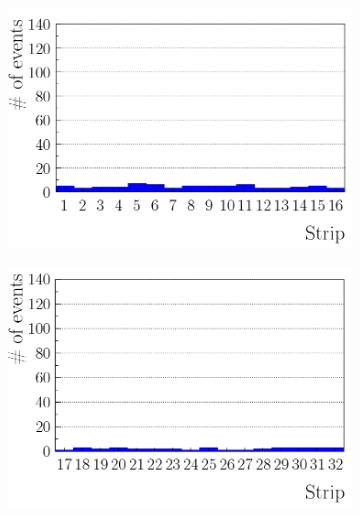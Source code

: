 			\begin{figure}[!h]
			\begin{subfigure}{0.5\linewidth}
				\begin{center}
					\includegraphics[width = 0.5\plotwidth]{fig/A1.pdf}
					\caption{\label{fig:HitProf:A1}}
				\end{center}
			\end{subfigure}
			\begin{subfigure}{0.5\linewidth}
				\begin{center}
					\includegraphics[width = 0.5\plotwidth]{fig/A2.pdf}\\
					\caption{\label{fig:HitProf:A2}}
				\end{center}
			\end{subfigure}
			\begin{subfigure}{0.5\linewidth}

\end{subfigure}
\end{figure}

